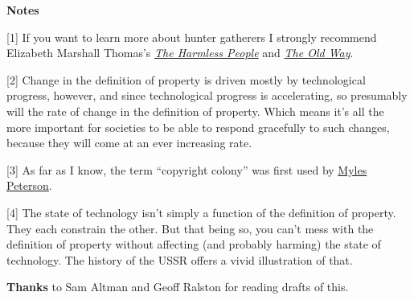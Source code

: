 \textbf{Notes}

{[}1{]} If you want to learn more about hunter gatherers I strongly
recommend Elizabeth Marshall Thomas's
\href{http://www.amazon.com/Harmless-People-Elizabeth-Marshall-Thomas/dp/0394427793}{\emph{The
Harmless People}} and
\href{http://www.amazon.com/Old-Way-Story-First-People/dp/0374225524}{\emph{The
Old Way}}.

{[}2{]} Change in the definition of property is driven mostly by
technological progress, however, and since technological progress is
accelerating, so presumably will the rate of change in the definition of
property. Which means it's all the more important for societies to be
able to respond gracefully to such changes, because they will come at an
ever increasing rate.

{[}3{]} As far as I know, the term ``copyright colony'' was first used
by
\href{http://torrentfreak.com/australia-us-copyright-colony-or-just-a-good-friend-120121/}{Myles
Peterson}.

{[}4{]} The state of technology isn't simply a function of the
definition of property. They each constrain the other. But that being
so, you can't mess with the definition of property without affecting
(and probably harming) the state of technology. The history of the USSR
offers a vivid illustration of that.

\textbf{Thanks} to Sam Altman and Geoff Ralston for reading drafts of
this.
